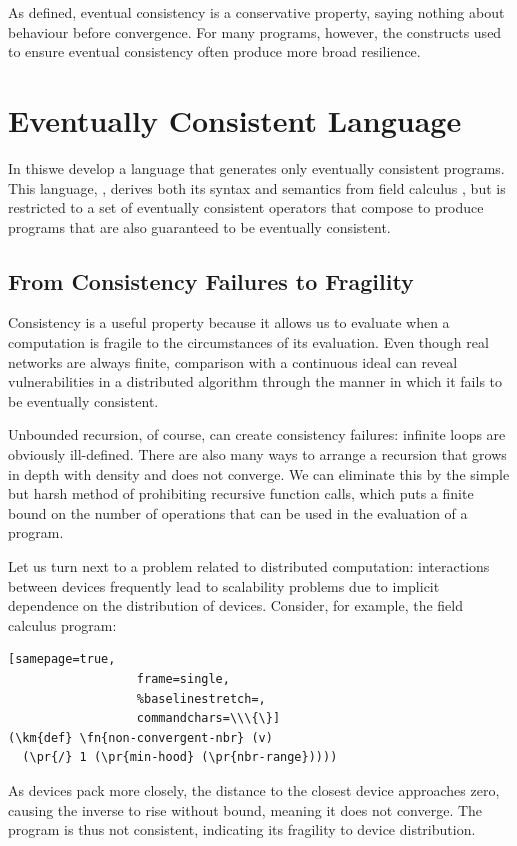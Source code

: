 \documentclass[12pt,a4paper,twoside,openright]{book}
\begin{document}
As defined, eventual consistency is a conservative property, saying nothing about behaviour before convergence.
%
For many programs, however, the constructs used to ensure eventual consistency often produce more broad resilience.

\section{Eventually Consistent Language}

In this\levelText{}we develop a language that generates only eventually consistent programs.
%
This language, \calculus{}, derives both its syntax and semantics from field calculus \cite{VDB-FOCLASA-CIC2013}, but is restricted to a set of eventually consistent operators that compose to produce programs that are also guaranteed to be eventually consistent.

\subsection{From Consistency Failures to Fragility}

Consistency is a useful property because it allows us to evaluate when a computation is fragile to the circumstances of its evaluation.
%
Even though real networks are always finite, comparison with a continuous ideal can reveal vulnerabilities in a distributed algorithm through the manner in which it fails to be eventually consistent.

Unbounded recursion, of course, can create consistency failures: infinite loops are obviously ill-defined.  There are also many ways to arrange a recursion that grows in depth with density and does not converge.
%
We can eliminate this by the simple but harsh method of prohibiting recursive function calls, which puts a finite bound on the number of operations that can be used in the evaluation of a program.

Let us turn next to a problem related to distributed computation: interactions between devices frequently lead to scalability problems due to implicit dependence on the distribution of devices.
%
Consider, for example, the field calculus program:
\begin{samepage}
\begin{Verbatim}[samepage=true,
                  frame=single,
                  %baselinestretch=,
                  commandchars=\\\{\}]
(\km{def} \fn{non-convergent-nbr} (v)
  (\pr{/} 1 (\pr{min-hood} (\pr{nbr-range}))))
\end{Verbatim}
\end{samepage}
As devices pack more closely, the distance to the closest device approaches zero, causing the inverse to rise without bound, meaning it does not converge.  The program is thus not consistent, indicating its fragility to device distribution.
\end{document}
